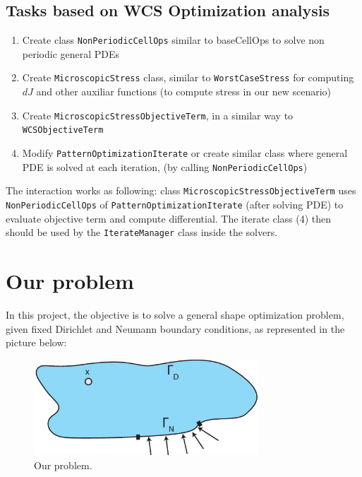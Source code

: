 \documentclass[11pt]{article}
\begin{document}
\subsection{Tasks based on WCS Optimization analysis}
\begin{enumerate}
  \item Create class \texttt{NonPeriodicCellOps} similar to baseCellOps to solve non periodic general PDEs
  \item Create \texttt{MicroscopicStress} class, similar to \texttt{WorstCaseStress} for computing $dJ$ and other auxiliar functions (to compute stress in our new scenario)
  \item Create \texttt{MicroscopicStressObjectiveTerm}, in a similar way to \texttt{WCSObjectiveTerm}
  \item Modify \texttt{PatternOptimizationIterate} or create similar class where general PDE is solved at each iteration, (by calling \texttt{NonPeriodicCellOps})
\end{enumerate}

The interaction works as following: class \texttt{MicroscopicStressObjectiveTerm} uses \linebreak\texttt{NonPeriodicCellOps} of \texttt{PatternOptimizationIterate} (after solving PDE) to evaluate objective term and compute differential. The iterate class (4) then should be used by the \texttt{IterateManager} class inside the solvers.



\section{Our problem}
In this project, the objective is to solve a general shape optimization problem, given fixed Dirichlet and Neumann boundary conditions, as represented in the picture below:

  \begin{figure}[hbt]
    \begin{center}
      \includegraphics[width=0.75\textwidth]{figures/problem}
    \end{center}
    \caption{Our problem.}
    \label{fig:problem}
  \end{figure}
\end{document}
